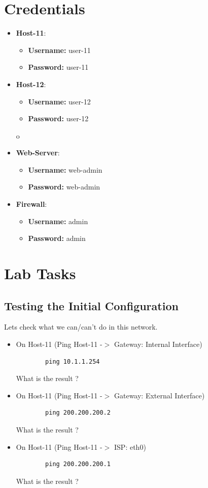 \section{Credentials}
\begin{itemize}
	\item \textbf{Host-11}:
	\begin{itemize}
		\item \textbf{Username:} user-11
		\item \textbf{Password:} user-11
	\end{itemize}
	\item \textbf{Host-12}:
	\begin{itemize}
		\item \textbf{Username:} user-12
		\item \textbf{Password:} user-12
	\end{itemize}o
	\item \textbf{Web-Server}:
	\begin{itemize}
		\item \textbf{Username:} web-admin
		\item \textbf{Password:} web-admin
	\end{itemize}
	\item \textbf{Firewall}:
	\begin{itemize}
		\item \textbf{Username:} admin
		\item \textbf{Password:} admin
	\end{itemize}
\end{itemize}

\section{Lab Tasks}

\subsection{Testing the Initial Configuration}\label{Testing the Initial Configuration}
Lets check what we can/can't do in this network.
\newline
\begin{itemize}
	\item On Host-11 (Ping Host-11 -$>$ Gateway: Internal Interface)
	\begin{verbatim}
	    ping 10.1.1.254
	\end{verbatim}

	What is the result ?

	\item On Host-11 (Ping Host-11 -$>$ Gateway: External Interface)
	\begin{verbatim}
	    ping 200.200.200.2
	\end{verbatim}

	What is the result ?

	\item On Host-11 (Ping Host-11 -$>$ ISP: eth0)
	\begin{verbatim}
	    ping 200.200.200.1
	\end{verbatim}

	What is the result ?

\end{itemize}

